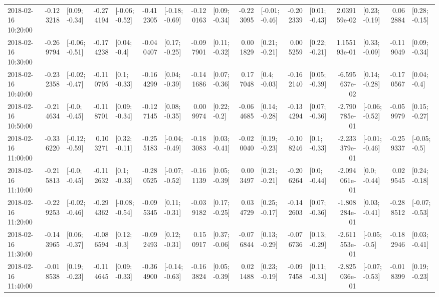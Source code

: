 \begin{tabular}{lrlrlrlrlrlrlrlrl}
2018-02-16 10:20:00 & -0.123218 &   [0.09; -0.34] & -0.274194 &  [-0.06; -0.52] & -0.412305 &  [-0.18; -0.69] & -0.120163 &   [0.09; -0.34] & -0.223095 &  [-0.01; -0.46] & -0.202339 &   [0.01; -0.43] &  2.039159e-02 &   [0.23; -0.19] &  0.062884 &   [0.28; -0.15] \\
2018-02-16 10:30:00 & -0.269794 &  [-0.06; -0.51] & -0.174238 &    [0.04; -0.4] & -0.040407 &   [0.17; -0.25] & -0.097901 &   [0.11; -0.32] &  0.001829 &   [0.21; -0.21] &  0.005259 &   [0.22; -0.21] &  1.155193e-01 &   [0.33; -0.09] & -0.119049 &   [0.09; -0.34] \\
2018-02-16 10:40:00 & -0.232358 &  [-0.02; -0.47] & -0.110795 &    [0.1; -0.33] & -0.164299 &   [0.04; -0.39] & -0.141686 &   [0.07; -0.36] &  0.177048 &    [0.4; -0.03] & -0.162140 &   [0.05; -0.39] & -6.595637e-02 &   [0.14; -0.28] & -0.170567 &    [0.04; -0.4] \\
2018-02-16 10:50:00 & -0.214634 &   [-0.0; -0.45] & -0.118701 &   [0.09; -0.34] & -0.127145 &   [0.08; -0.35] &  0.009974 &    [0.22; -0.2] & -0.064685 &   [0.14; -0.28] & -0.134294 &   [0.07; -0.36] & -2.790785e-01 &  [-0.06; -0.52] & -0.059979 &   [0.15; -0.27] \\
2018-02-16 11:00:00 & -0.336220 &  [-0.12; -0.59] &  0.103271 &   [0.32; -0.11] & -0.255183 &  [-0.04; -0.49] & -0.183083 &   [0.03; -0.41] & -0.020040 &   [0.19; -0.23] & -0.108246 &    [0.1; -0.33] & -2.233379e-01 &  [-0.01; -0.46] & -0.259337 &   [-0.05; -0.5] \\
2018-02-16 11:10:00 & -0.215813 &   [-0.0; -0.45] & -0.112632 &    [0.1; -0.33] & -0.280525 &  [-0.07; -0.52] & -0.161139 &   [0.05; -0.39] &  0.003497 &   [0.21; -0.21] & -0.206264 &    [0.0; -0.44] & -2.094061e-01 &    [0.0; -0.44] &  0.029545 &   [0.24; -0.18] \\
2018-02-16 11:20:00 & -0.229253 &  [-0.02; -0.46] & -0.294362 &  [-0.08; -0.54] & -0.095345 &   [0.11; -0.31] & -0.039182 &   [0.17; -0.25] &  0.034729 &   [0.25; -0.17] & -0.142603 &   [0.07; -0.36] & -1.808284e-01 &   [0.03; -0.41] & -0.288512 &  [-0.07; -0.53] \\
2018-02-16 11:30:00 & -0.143965 &   [0.06; -0.37] & -0.086594 &    [0.12; -0.3] & -0.092493 &   [0.12; -0.31] &  0.150917 &   [0.37; -0.06] & -0.076844 &   [0.13; -0.29] & -0.076736 &   [0.13; -0.29] & -2.611553e-01 &   [-0.05; -0.5] & -0.182946 &   [0.03; -0.41] \\
2018-02-16 11:40:00 & -0.018538 &   [0.19; -0.23] & -0.114645 &   [0.09; -0.33] & -0.364900 &  [-0.14; -0.63] & -0.163824 &   [0.05; -0.39] &  0.021488 &   [0.23; -0.19] & -0.097458 &   [0.11; -0.31] & -2.825036e-01 &  [-0.07; -0.53] & -0.018399 &   [0.19; -0.23] \\

\end{tabular}
